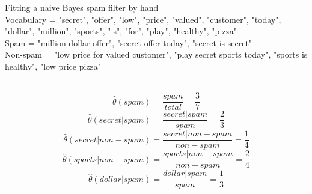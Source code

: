 \documentclass[draft]{exam} %
\theoremstyle{definition} \newtheorem*{defn}{Definition}
\begin{document}
\begin{questions}
 Fitting a naive Bayes spam filter by hand\\
Vocabulary = "secret", "offer", "low", "price", "valued", "customer", "today", "dollar", "million", "sports", "is", "for", "play", "healthy", "pizza"\\
Spam =  "million dollar offer", "secret offer today", "secret is secret"\\
Non-spam = "low price for valued customer", "play secret sports today", "sports is healthy", "low price pizza"\\
\begin{solution} \\%
$$\hat{\theta}(spam)=\frac{spam}{total}=\frac{3}{7}$$
$$\hat{\theta}(secret|spam)=\frac{secret|spam}{spam}=\frac{2}{3}$$
$$\hat{\theta}(secret|non-spam)=\frac{secret|non-spam}{non-spam}=\frac{1}{4}$$
$$\hat{\theta}(sports|non-spam)=\frac{sports|non-spam}{non-spam}=\frac{2}{4}$$
$$\hat{\theta}(dollar|spam)=\frac{dollar|spam}{spam}=\frac{1}{3}$$
\end{solution} %


\end{questions}
\end{document}
